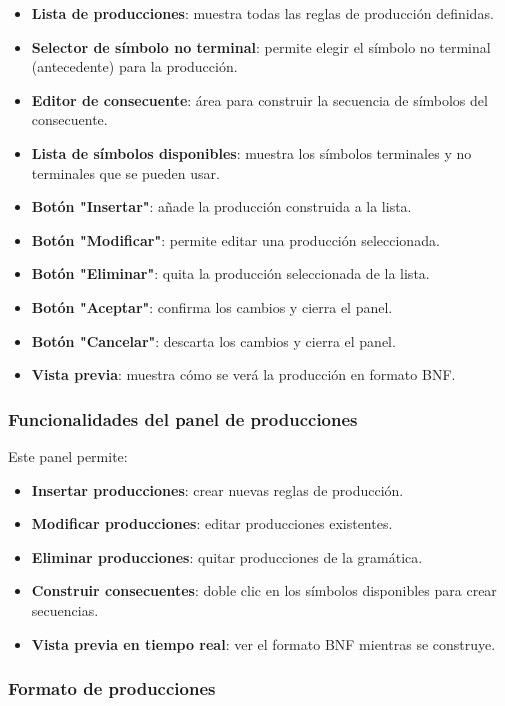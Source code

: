 \begin{itemize}
    \item \textbf{Lista de producciones}: muestra todas las reglas de producción definidas.
    \item \textbf{Selector de símbolo no terminal}: permite elegir el símbolo no terminal (antecedente) para la producción.
    \item \textbf{Editor de consecuente}: área para construir la secuencia de símbolos del consecuente.
    \item \textbf{Lista de símbolos disponibles}: muestra los símbolos terminales y no terminales que se pueden usar.
    \item \textbf{Botón \string"Insertar\string"}: añade la producción construida a la lista.
    \item \textbf{Botón \string"Modificar\string"}: permite editar una producción seleccionada.
    \item \textbf{Botón \string"Eliminar\string"}: quita la producción seleccionada de la lista.
    \item \textbf{Botón \string"Aceptar\string"}: confirma los cambios y cierra el panel.
    \item \textbf{Botón \string"Cancelar\string"}: descarta los cambios y cierra el panel.
    \item \textbf{Vista previa}: muestra cómo se verá la producción en formato BNF.
\end{itemize}

\subsubsection{Funcionalidades del panel de producciones}

Este panel permite:
\begin{itemize}
    \item \textbf{Insertar producciones}: crear nuevas reglas de producción.
    \item \textbf{Modificar producciones}: editar producciones existentes.
    \item \textbf{Eliminar producciones}: quitar producciones de la gramática.
    \item \textbf{Construir consecuentes}: doble clic en los símbolos disponibles para crear secuencias.
    \item \textbf{Vista previa en tiempo real}: ver el formato BNF mientras se construye.
\end{itemize}

\subsubsection{Formato de producciones}

